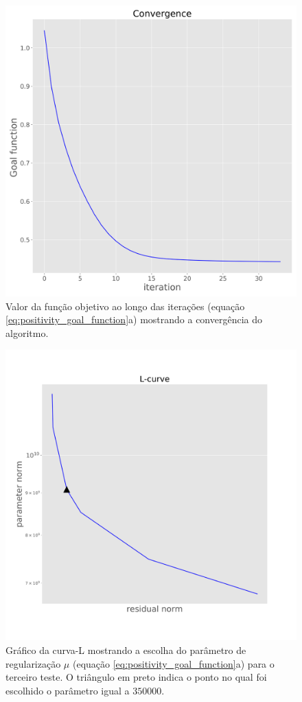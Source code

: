 \begin{figure}
	\centering
	\includegraphics[width=.9\textwidth]{Fig/eqlayer/unidir_shallow_diff_test/convergence_LM_NNLS_magRM.png}
	\caption{Valor da função objetivo ao longo das iterações (equação \ref{eq:positivity_goal_function}a) mostrando a convergência do algoritmo.}
	\label{fig:convergence_3}
\end{figure}

\begin{figure}
	\centering
	\includegraphics[width=.9\textwidth]{Fig/eqlayer/unidir_shallow_diff_test/Lcurve_RM.png}
	\caption{Gráfico da curva-L mostrando a escolha do parâmetro de regularização $\mu$ (equação \ref{eq:positivity_goal_function}a) para o terceiro teste. O triângulo em preto indica o ponto no qual foi escolhido o parâmetro igual a $350000$.}
	\label{fig:lcurve_3}
\end{figure}
